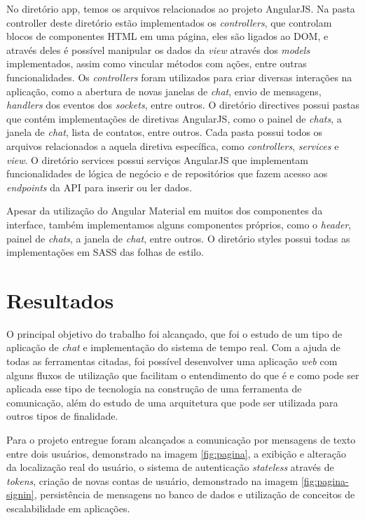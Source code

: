 No diretório app, temos os arquivos relacionados ao projeto AngularJS. Na pasta controller deste diretório estão implementados os \textit{controllers}, que controlam blocos de componentes HTML em uma página, eles são ligados ao DOM, e através deles é possível manipular os dados da \textit{view} através dos \textit{models} implementados, assim como vincular métodos com ações, entre outras funcionalidades. Os \textit{controllers} foram utilizados para criar diversas interações na aplicação, como a abertura de novas janelas de \textit{chat}, envio de mensagens, \textit{handlers} dos eventos dos \textit{sockets}, entre outros. O diretório directives possui pastas que contém implementações de diretivas AngularJS, como o painel de \textit{chats}, a janela de \textit{chat}, lista de contatos, entre outros. Cada pasta possui todos os arquivos relacionados a aquela diretiva específica, como \textit{controllers}, \textit{services} e \textit{view}. O diretório services possui serviços AngularJS que implementam funcionalidades de lógica de negócio e de repositórios que fazem acesso aos \textit{endpoints} da API para inserir ou ler dados.

Apesar da utilização do Angular Material em muitos dos componentes da interface, também implementamos alguns componentes próprios, como o \textit{header}, painel de \textit{chats}, a janela de \textit{chat}, entre outros. O diretório styles possui todas as implementações em SASS das folhas de estilo.

\section{Resultados}

O principal objetivo do trabalho foi alcançado, que foi o estudo de um tipo de aplicação de \textit{chat} e implementação do sistema de tempo real. Com a ajuda de todas as ferramentas citadas, foi possível desenvolver uma aplicação \textit{web} com alguns fluxos de utilização que facilitam o entendimento do que é e como pode ser aplicada esse tipo de tecnologia na construção de uma ferramenta de comunicação, além do estudo de uma arquitetura que pode ser utilizada para outros tipos de finalidade. 

Para o projeto entregue foram alcançados a comunicação por mensagens de texto entre dois usuários, demonstrado na imagem \ref{fig:pagina}, a exibição e alteração da localização real do usuário, o sistema de autenticação \textit{stateless} através de \textit{tokens}, criação de novas contas de usuário, demonstrado na imagem \ref{fig:pagina-signin}, persistência de mensagens no banco de dados e utilização de conceitos de escalabilidade em aplicações. 

